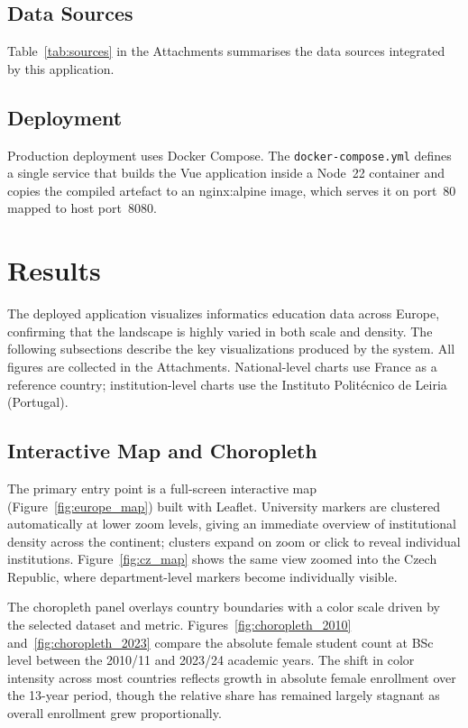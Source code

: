 \documentclass[final,3p,times,twocolumn]{elsarticle}
\begin{document}
\subsection{Data Sources}

Table~\ref{tab:sources} in the Attachments summarises the data sources integrated by this application.

\subsection{Deployment}

Production deployment uses Docker Compose. The \texttt{docker-compose.yml} defines a single service that builds the Vue application inside a Node~22 container and copies the compiled artefact to an nginx:alpine image, which serves it on port~80 mapped to host port~8080.

\section{Results}
\label{sec:results}

The deployed application visualizes informatics education data across Europe, confirming that the landscape is highly varied in both scale and density. The following subsections describe the key visualizations produced by the system. All figures are collected in the Attachments. National-level charts use France as a reference country; institution-level charts use the Instituto Polit\'{e}cnico de Leiria (Portugal).

\subsection{Interactive Map and Choropleth}

The primary entry point is a full-screen interactive map (Figure~\ref{fig:europe_map}) built with Leaflet. University markers are clustered automatically at lower zoom levels, giving an immediate overview of institutional density across the continent; clusters expand on zoom or click to reveal individual institutions. Figure~\ref{fig:cz_map} shows the same view zoomed into the Czech Republic, where department-level markers become individually visible.

The choropleth panel overlays country boundaries with a color scale driven by the selected dataset and metric. Figures~\ref{fig:choropleth_2010} and~\ref{fig:choropleth_2023} compare the absolute female student count at BSc level between the 2010/11 and 2023/24 academic years. The shift in color intensity across most countries reflects growth in absolute female enrollment over the 13-year period, though the relative share has remained largely stagnant as overall enrollment grew proportionally.
\end{document}
